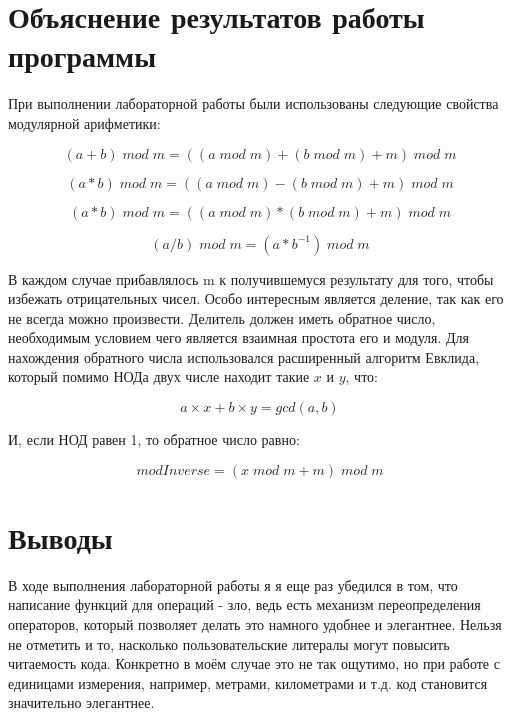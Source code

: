 \documentclass[a4paper, 12pt]{article}
\begin{document}
\newpage

\section{Объяснение результатов работы программы}

При выполнении лабораторной работы были использованы следующие свойства модулярной арифметики:

\[ (a + b)\;mod\;m = ((a\;mod\;m)+(b\;mod\;m) + m)\;mod\;m \]

\[ (a * b)\;mod\;m = ((a\;mod\;m)-(b\;mod\;m) + m)\;mod\;m \]

\[ (a * b)\;mod\;m = ((a\;mod\;m)*(b\;mod\;m) + m)\;mod\;m \]

\[ (a / b)\;mod\;m = (a*b^{-1})\;mod\;m \]

В каждом случае прибавлялось m к получившемуся результату для того, чтобы избежать отрицательных чисел. Особо интересным является деление, так как его не всегда можно произвести. Делитель должен иметь обратное число, необходимым условием чего является взаимная простота его и модуля. Для нахождения обратного числа использовался расширенный алгоритм Евклида, который помимо НОДа двух числе находит такие $ x $  и $ y $, что:

\[ a \times x + b\times y = gcd(a,b) \]

И, если НОД равен 1, то обратное число равно:

\[ modInverse = (x\;mod\;m + m)\;mod\;m \]

\newpage
\section{Выводы}

В ходе выполнения лабораторной работы я  я еще раз убедился в том, что написание функций для операций - зло, ведь есть механизм переопределения операторов, который позволяет делать это намного удобнее и элегантнее. Нельзя не отметить и то, насколько пользовательские литералы могут повысить читаемость кода. Конкретно в моём случае это не так ощутимо, но при работе с единицами измерения, например, метрами, километрами и т.д. код становится значительно элегантнее. 
\end{document}
